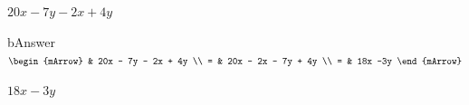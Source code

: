 \begin{enumerate}[resume]
\begin{subtask}
    \task[]  $ 20x - 7y - 2x + 4y $
              \begin{envOut}[height=6cm]{bAnswer}
			       $\begin{mArrow}
			                & 20x - 7y - 2x + 4y      \\ 
                          = & 20x - 2x - 7y + 4y    \\ 
                          = & 18x -3y 
	                \end{mArrow}$
              \end{envOut}			  
			  \begin{exercise}\begin{shortsolution}  
				       $18x -3y$
			  \end{shortsolution}\end{exercise}  
    \end{subtask}
\end{enumerate}



